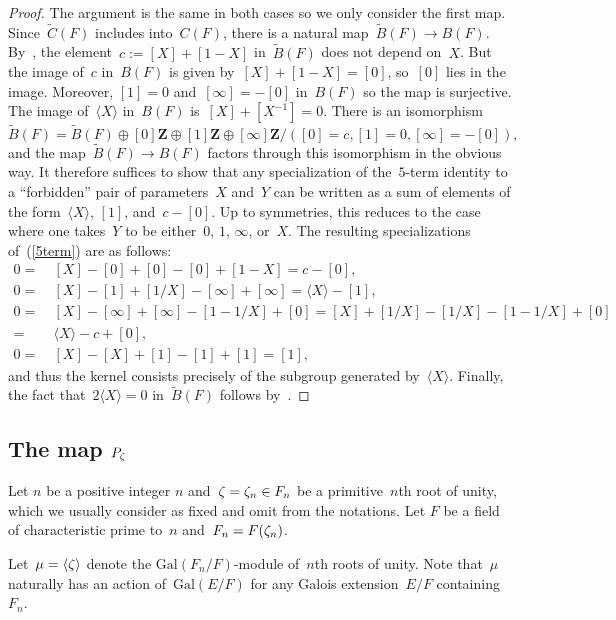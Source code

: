 \documentclass[12pt,reqno]{amsart}
\theoremstyle{definition}
\newcommand{\changed}[1]{{#1}}
\newcommand{\newfrankchanged}[1]{{#1}}
\def\BB{\widetilde{B}}
\def\CC{\widetilde{C}}
\def\Z{\mathbf Z}   %
\def\nn{n}
\def\Gal{\mathrm{Gal}}
\begin{document}
{\begin{proof}
\newfrankchanged{The argument is the same in both cases so we only consider the first map.}
Since~$\CC(F)$ includes into~$C(F)$, there is
a natural map~$\BB(F) \rightarrow B(F)$. By~\cite[Lemma~1.3]{Suslintwo},
the element~$c:=[X]+[1-X]$ in~$\BB(F)$ does not depend on~$X$. But the image of~$c$
in~$B(F)$ is given by~$[X]+[1-X]=[0]$, so~$[0]$ lies in the image. Moreover, $[1]=0$
and~$[\infty]=-[0]$ in~$B(F)$ so the map is surjective.
The image of~$\langle X \rangle$ in~$B(F)$ is~$[X]+[X^{-1}] =0$. 
There is an isomorphism
$$\BB(F) = \BB(F) \oplus [0]\Z \oplus [1]\Z  \oplus [\infty]\Z/([0]=c, [1]=0, [\infty]=-[0]),$$
and the map~$\BB(F) \rightarrow B(F)$ factors through this isomorphism in the obvious way.
It therefore suffices to show
that any specialization of the~$5$-term identity to a ``forbidden'' pair
of parameters~$X$ and~$Y$ can be written 
as a sum of elements of the form~$\langle X \rangle$, $[1]$, and~$c - [0]$. 
Up to symmetries, this reduces to the case where one takes~$Y$ to be either~$0$, $1$, $\infty$, or~$X$.
The resulting specializations of~(\ref{5term}) are as follows:
$$
\begin{aligned}
0= \ & [X]-[0]+[0]-[0]+[1-X] =  c - [0], \\ 
0 = \ & [X]-[1]+[1/X]-[\infty]+[\infty] =   \langle X \rangle - [1], \\
0 = \ & [X] - [\infty] + [\infty] - [1-1/X] + [0] =  [X] + [1/X] - [1/X]-[1-1/X]+[0] \\
= \ &  \langle X \rangle - c + [0],  \\
0 = \ & [X] - [X] +[1] - [1] + [1] =  [1],
\end{aligned} $$
and thus the kernel consists precisely of the subgroup generated by~$\langle X \rangle$.
Finally, the fact that~$2\langle X \rangle  = 0$ in~$\BB(F)$ follows by~\cite[Lemma~1.2]{Suslintwo}.
\end{proof}
}



\subsection{The map \texorpdfstring{$P_\zeta$}{Pz}}

\changed{Let $\nn$ be a positive integer $\nn$ and~$\z=\z_\nn\in F_\nn$ be a
primitive~$\nn$th root of unity, which we usually consider as fixed and
omit from the notations. Let $F$ be a field of characteristic 
prime to~$\nn$ and~$F_\nn  = F(\z_\nn)$.}

Let~$\mu = \langle \zeta \rangle$ denote the \changed{$\Gal(F_{\nn}/F)$-module of~$\nn$th roots 
of unity. Note that~$\mu$ naturally has an action of~$\Gal(E/F)$ for any Galois extension~$E/F$
containing~$F_{\nn}$.}
\end{document}
